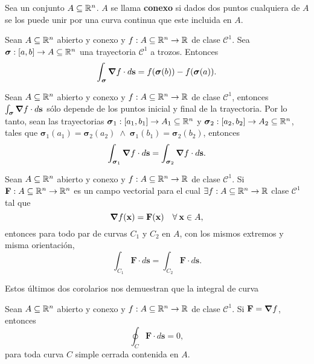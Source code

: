 \begin{definition}
    Sea un conjunto $A\subseteq\mathbb{R}^n$. $A$ se llama \textbf{conexo} si dados dos puntos cualquiera de $A$ se los puede unir por una curva continua que este incluida en $A$.
\end{definition}

\begin{theorem} \label{thm:t1}
    Sean $A\subseteq\mathbb{R}^n$ abierto y conexo y $f:A\subseteq\mathbb{R}^n\to\mathbb{R}$ de clase $\mathcal{C}^1$. Sea $\boldsymbol{\sigma}:[a,b]\to A\subseteq\mathbb{R}^n$ una trayectoria $\mathcal{C}^1$ a trozos. Entonces
    \[
       \int_{\boldsymbol{\sigma}}\grad f\cdot d\mathbf{s}=f(\boldsymbol{\sigma}(b))-f(\boldsymbol{\sigma}(a)).
    \]    
\end{theorem}

\begin{corollary}
    Sean $A\subseteq\mathbb{R}^n$ abierto y conexo y $f:A\subseteq\mathbb{R}^n\to\mathbb{R}$ de clase $\mathcal{C}^1$, entonces $\int_{\boldsymbol{\sigma}}\grad f\cdot d\mathbf{s}$  s\'olo depende de los puntos inicial y final de la trayectoria. Por lo tanto, sean las trayectorias $\boldsymbol{\sigma}_1:[a_1,b_1]\to A_1\subseteq\mathbb{R}^n$ y $\boldsymbol{\sigma}_2:[a_2,b_2]\to A_2\subseteq\mathbb{R}^n$, tales que $\boldsymbol{\sigma}_1(a_1)=\boldsymbol{\sigma}_2(a_2)\;\land\;\boldsymbol{\sigma}_1(b_1)=\boldsymbol{\sigma}_2(b_2)$, entonces
    \[
    \int_{\boldsymbol{\sigma}_1}\grad f\cdot d\mathbf{s}=\int_{\boldsymbol{\sigma}_2}\grad f\cdot d\mathbf{s}.
    \]
\end{corollary}

\begin{corollary}
    Sean $A\subseteq\mathbb{R}^n$ abierto y conexo y $f:A\subseteq\mathbb{R}^n\to\mathbb{R}$ de clase $\mathcal{C}^1$. Si $\mathbf{F}:A\subseteq\mathbb{R}^n\to\mathbb{R}^n$ es un campo vectorial para el cual $\exists f:A\subseteq\mathbb{R}^n\to\mathbb{R}$ clase $\mathcal{C}^1$ tal que 
    $$\grad f(\mathbf{x})=\mathbf{F}(\mathbf{x})\quad\forall\:\mathbf{x}\in A,$$
    entonces para todo par de curvas $C_1$ y $C_2$ en $A$, con los mismos extremos y misma orientaci\'on,
    \[
    \int_{C_1}\mathbf{F}\cdot d\mathbf{s}=\int_{C_2}\mathbf{F}\cdot d\mathbf{s}. 
    \]
\end{corollary}

Estos \'ultimos dos corolarios nos demuestran que la integral de curva 

\begin{corollary}
    Sean $A\subseteq\mathbb{R}^n$ abierto y conexo y $f:A\subseteq\mathbb{R}^n\to\mathbb{R}$ de clase $\mathcal{C}^1$. Si $\mathbf{F}=\grad f$, entonces
    $$\oint_C\mathbf{F}\cdot d\mathbf{s}=0,$$
    para toda curva $C$ simple cerrada contenida en $A$.
\end{corollary}


